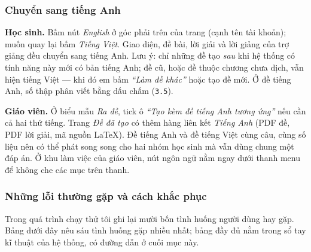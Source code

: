 \subsubsection{Chuyển sang tiếng Anh}

\textbf{Học sinh.} Bấm nút \textit{English} ở góc phải trên của trang (cạnh tên tài
khoản); muốn quay lại bấm \textit{Tiếng Việt}. Giao diện, đề bài, lời giải và lời
giảng của trợ giảng đều chuyển sang tiếng Anh. Lưu ý: chỉ những đề tạo \textit{sau}
khi hệ thống có tính năng này mới có bản tiếng Anh; đề cũ, hoặc đề thuộc chương
chưa dịch, vẫn hiện tiếng Việt --- khi đó em bấm \textit{``Làm đề khác''} hoặc tạo đề
mới. Ở đề tiếng Anh, số thập phân viết bằng dấu chấm (\texttt{3.5}).

\textbf{Giáo viên.} Ở biểu mẫu \textit{Ra đề}, tick ô \textit{``Tạo kèm đề tiếng Anh
tương ứng''} nếu cần cả hai thứ tiếng. Trang \textit{Đề đã tạo} có thêm hàng liên
kết \textit{Tiếng Anh} (PDF đề, PDF lời giải, mã nguồn \LaTeX). Đề tiếng Anh và đề
tiếng Việt cùng câu, cùng số liệu nên có thể phát song song cho hai nhóm học sinh
mà vẫn dùng chung một đáp án. Ở khu làm việc của giáo viên, nút ngôn ngữ nằm ngay
dưới thanh menu để không che các mục trên thanh.

\subsubsection{Những lỗi thường gặp và cách khắc phục}

Trong quá trình chạy thử tôi ghi lại mười bốn tình huống người dùng hay gặp.
Bảng dưới đây nêu sáu tình huống gặp nhiều nhất; bảng đầy đủ nằm trong sổ tay kĩ
thuật của hệ thống, có đường dẫn ở cuối mục này.

